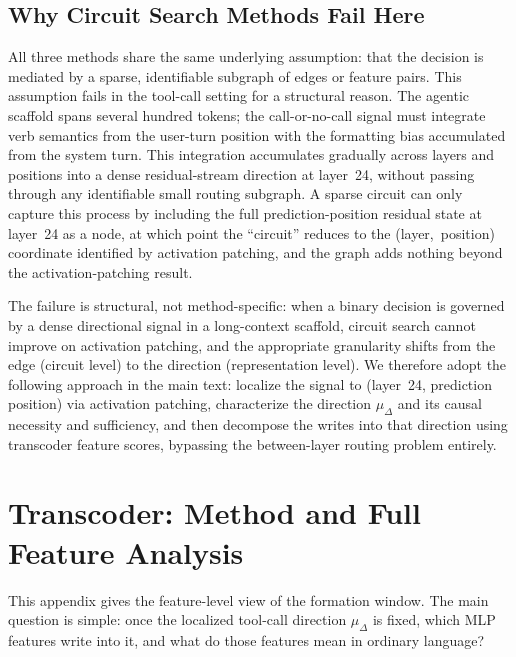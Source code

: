 \subsection{Why Circuit Search Methods Fail Here}
\label{appendix:circuit:failure}
All three methods share the same underlying assumption: that the decision is
mediated by a sparse, identifiable subgraph of edges or feature pairs.
This assumption fails in the tool-call setting for a structural reason.
The agentic scaffold spans several hundred tokens; the call-or-no-call signal
must integrate verb semantics from the user-turn position with the formatting
bias accumulated from the system turn.
This integration accumulates gradually across layers and positions into a
dense residual-stream direction at layer~24, without passing through any
identifiable small routing subgraph.
A sparse circuit can only capture this process by including the full
prediction-position residual state at layer~24 as a node, at which point the
``circuit'' reduces to the (layer,~position) coordinate identified by
activation patching, and the graph adds nothing beyond the activation-patching result.

The failure is structural, not method-specific: when a binary decision is
governed by a dense directional signal in a long-context scaffold, circuit
search cannot improve on activation patching, and the appropriate granularity
shifts from the edge (circuit level) to the direction (representation level).
We therefore adopt the following approach in the main text: localize the signal to
(layer~24, prediction position) via activation patching, characterize the
direction $\mu_\Delta$ and its causal necessity and sufficiency, and then
decompose the writes into that direction using transcoder feature scores,
bypassing the between-layer routing problem entirely.

\section{Transcoder: Method and Full Feature Analysis}
\label{appendix:transcoder}
This appendix gives the feature-level view of the formation window.
The main question is simple: once the localized tool-call direction
$\mu_\Delta$ is fixed, which MLP features write into it, and what do those
features mean in ordinary language?

